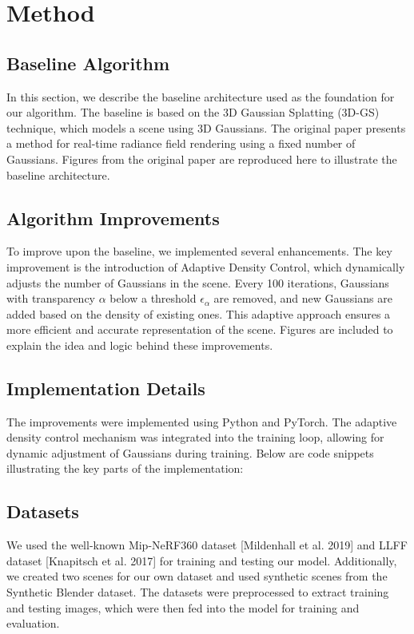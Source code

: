 \documentclass[12pt]{report}
\begin{document}
\chapter{Method}

\section{Baseline Algorithm}
In this section, we describe the baseline architecture used as the foundation for our algorithm. The baseline is based on the 3D Gaussian Splatting (3D-GS) technique, which models a scene using 3D Gaussians. The original paper presents a method for real-time radiance field rendering using a fixed number of Gaussians. Figures from the original paper are reproduced here to illustrate the baseline architecture.

\section{Algorithm Improvements}
To improve upon the baseline, we implemented several enhancements. The key improvement is the introduction of Adaptive Density Control, which dynamically adjusts the number of Gaussians in the scene. Every 100 iterations, Gaussians with transparency $\alpha$ below a threshold $\epsilon_\alpha$ are removed, and new Gaussians are added based on the density of existing ones. This adaptive approach ensures a more efficient and accurate representation of the scene. Figures are included to explain the idea and logic behind these improvements.

\section{Implementation Details}
The improvements were implemented using Python and PyTorch. The adaptive density control mechanism was integrated into the training loop, allowing for dynamic adjustment of Gaussians during training. Below are code snippets illustrating the key parts of the implementation:


\section{Datasets}
We used the well-known Mip-NeRF360 dataset [Mildenhall et al. 2019] and LLFF dataset [Knapitsch et al. 2017] for training and testing our model. Additionally, we created two scenes for our own dataset and used synthetic scenes from the Synthetic Blender dataset. The datasets were preprocessed to extract training and testing images, which were then fed into the model for training and evaluation.
\end{document}
